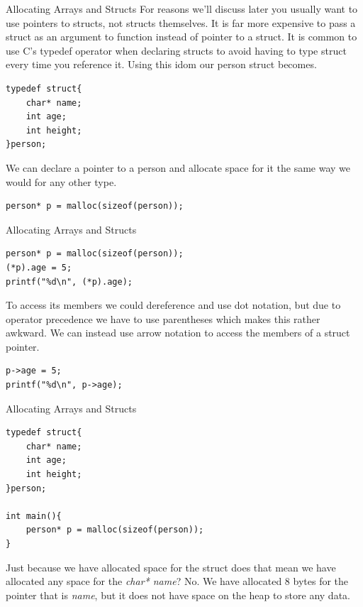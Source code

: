 \documentclass{beamer}
\begin{document}
\begin{frame}[fragile]{Allocating Arrays and Structs}
For reasons we'll discuss later you usually want to use pointers to structs, not structs themselves. It is far more expensive to pass a struct as an argument to function instead of pointer to a struct. It is common to use C's typedef operator when declaring structs to avoid having to type struct every time you reference it. Using this idom our person struct becomes. 

\begin{verbatim}
typedef struct{
	char* name;
	int age;
	int height;
}person;
\end{verbatim}
We can declare a pointer to a person and allocate space for it the same way we would for any other type.
\begin{verbatim}
person* p = malloc(sizeof(person));
\end{verbatim}
\end{frame}

\begin{frame}[fragile]{Allocating Arrays and Structs}
\begin{verbatim}
person* p = malloc(sizeof(person));
(*p).age = 5;
printf("%d\n", (*p).age);
\end{verbatim}
To access its members we could dereference and use dot notation, but due to operator precedence we have to use parentheses which makes this rather awkward. We can instead use arrow notation to access the members of a struct pointer.
\begin{verbatim}
p->age = 5;
printf("%d\n", p->age);
\end{verbatim}
\end{frame}

\begin{frame}[fragile]{Allocating Arrays and Structs}
\begin{verbatim}
typedef struct{
	char* name;
	int age;
	int height;
}person;

int main(){
	person* p = malloc(sizeof(person));
}
\end{verbatim}
Just because we have allocated space for the struct does that mean we have allocated any space for the {\it char* name}? No. We have allocated 8 bytes for the pointer that is {\it name}, but it does not have space on the heap to store any data.
\end{frame}
\end{document}

